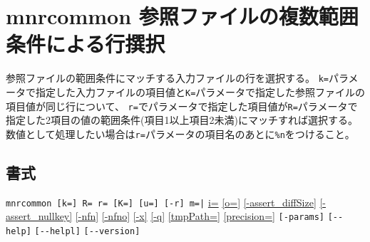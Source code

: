 
%

\section{mnrcommon 参照ファイルの複数範囲条件による行撰択\label{sect:mnrcommon}}
参照ファイルの範囲条件にマッチする入力ファイルの行を選択する。
\verb|k=|パラメータで指定した入力ファイルの項目値と\verb|K=|パラメータで指定した参照ファイルの項目値が同じ行について、
\verb|r=|でパラメータで指定した項目値が\verb|R=|パラメータで指定した2項目の値の範囲条件(項目1以上項目2未満)にマッチすれば選択する。
数値として処理したい場合は\verb|r=|パラメータの項目名のあとに\verb|%n|をつけること。

\subsection*{書式}
\verb/mnrcommon [k=] R= r= [K=] [u=] [-r] m=|/ 
\hyperref[sect:option_i]{i=}
\hyperref[sect:option_o]{[o=]}
\hyperref[sect:option_assert_diffSize]{[-assert\_diffSize]}
\hyperref[sect:option_assert_nullkey]{[-assert\_nullkey]}
\hyperref[sect:option_nfn]{[-nfn]} 
\hyperref[sect:option_nfno]{[-nfno]}  
\hyperref[sect:option_x]{[-x]}
\hyperref[sect:option_q]{[-q]}
\hyperref[sect:option_option_tmppath]{[tmpPath=]}
\hyperref[sect:option_precision]{[precision=]}
\verb|[-params]|
\verb|[--help]|
\verb|[--helpl]|
\verb|[--version]|\\

